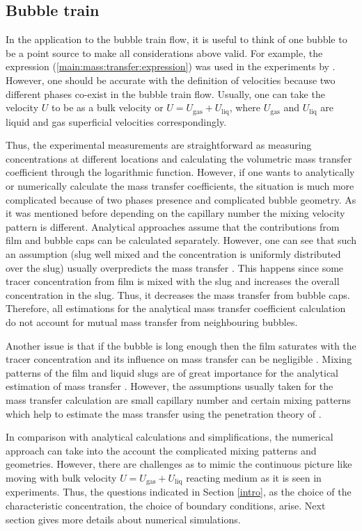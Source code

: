 \documentclass{article}
\newcommand{\uliq}{U_{\mathrm{liq}}}
\newcommand{\ugas}{U_{\mathrm{gas}}}
\begin{document}
\subsection{Bubble train}
In the application to the bubble train flow, it is useful to think of one bubble to be a point
source to make all considerations above valid. For example, the expression
(\ref{main:mass:transfer:expression}) was used in the experiments by
\citet{bercic-mass}. However, one should be accurate with the definition of velocities because two
different phases co-exist in the bubble train flow. Usually, one can take the velocity $U$ to be as
a bulk velocity or $U=\ugas+\uliq$, where $\ugas$ and $\uliq$ are liquid and gas
superficial velocities correspondingly. 

Thus, the experimental measurements are straightforward as measuring concentrations at
different
locations and calculating the volumetric mass transfer coefficient through the logarithmic
function. However, if one wants to analytically or numerically calculate the mass transfer coefficients, the
situation is much more complicated because of two phases presence and complicated bubble
geometry. As it was mentioned before depending on the capillary
number the mixing velocity pattern is different. Analytical approaches
\cite{irandoust,vanbaten-circular} assume that the
contributions from film and bubble caps can be calculated separately. However, one can see that
such 
an assumption (slug well mixed and the concentration is uniformly distributed over
the slug) usually overpredicts the mass transfer \cite{irandoust}. This happens since some tracer
concentration from film is mixed with the slug and increases the overall concentration in the slug. Thus, it decreases the mass transfer from bubble caps.
Therefore, all estimations for the analytical mass transfer coefficient calculation  do not account for mutual mass
transfer from
neighbouring bubbles.

Another issue is that if the bubble is long enough then the film saturates with the tracer
concentration and its influence on mass transfer can be negligible \cite{vanbaten-circular}.
Mixing patterns of the film and liquid slugs are of great importance for the analytical
estimation of mass transfer \cite{yue-mass}. However, the assumptions usually taken for the
mass transfer calculation are small capillary number and certain mixing patterns which help to
estimate the mass transfer using the penetration theory of \citet{higbie}.

In comparison with analytical calculations and simplifications, the numerical approach can take into
the account the complicated mixing patterns and geometries. However, there are challenges as to
mimic the continuous picture like moving with bulk velocity $U=\ugas+\uliq$ reacting medium as it is seen in
experiments. Thus, the questions indicated in Section \ref{intro}, as the choice of the
characteristic concentration, the choice of boundary conditions, arise. Next
section gives more details about numerical simulations.
 
\end{document}
